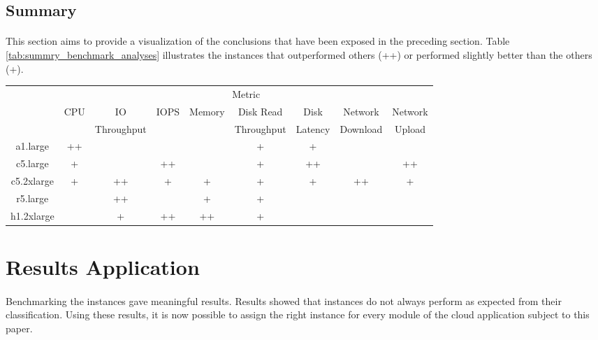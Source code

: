 \documentclass[11pt]{article}
\begin{document}
	\subsection{Summary}
		\paragraph{} This section aims to provide a visualization of the
		conclusions that have been exposed in the preceding section. Table
		\ref{tab:summry_benchmark_analyses} illustrates the instances that outperformed others (++) or
		performed slightly better than the others (+).

		\begin{center}
			\begin{minipage}{\linewidth}
			 \label{tab:summry_benchmark_analyses}	
			\begin{tabular}{|*{9}{c|}}
				\hline
				\multirow{3}{*}{} & \multicolumn{8}{c}{Metric}\vline \\\cline{2-9}
				& \multirow{2}{*}{CPU} & IO & \multirow{2}{*}{IOPS} & \multirow{2}{*}{Memory} &
				 			Disk Read & Disk & Network & Network \\
				&  & Throughput &  &  & Throughput & Latency & Download & Upload \\
				\hline
				a1.large & ++ & & & & + & + & & \\
				\hline
				c5.large & + & & ++ & & + & ++ & & ++ \\
				\hline
				c5.2xlarge & + & ++ & + & + & + & + & ++ & + \\
				\hline
				r5.large & & ++ & & + & + & & & \\
				\hline
				h1.2xlarge & & + & ++ & ++ & + & & & \\
				\hline
			\end{tabular}
			\end{minipage}
		\end{center}
		\pagebreak

	\section{Results Application} \label{sec:results_application}
		\paragraph{} Benchmarking the instances gave meaningful results. Results
		showed that instances do not always perform as expected from their
		classification. Using these results, it is now possible to assign the
		right instance for every module of the cloud application subject to this
		paper.
\end{document}
